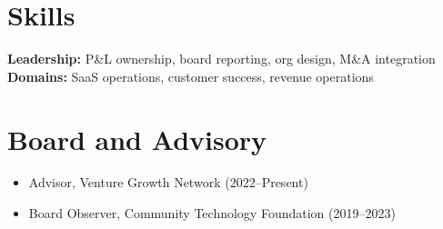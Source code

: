 \documentclass[11pt,letterpaper]{article}
\begin{document}
\section{Skills}
\noindent\textbf{Leadership:} P\&L ownership, board reporting, org design, M\&A integration\\
\textbf{Domains:} SaaS operations, customer success, revenue operations

\section{Board and Advisory}
\begin{itemize}
  \item Advisor, Venture Growth Network (2022--Present)
  \item Board Observer, Community Technology Foundation (2019--2023)
\end{itemize}
\end{document}
